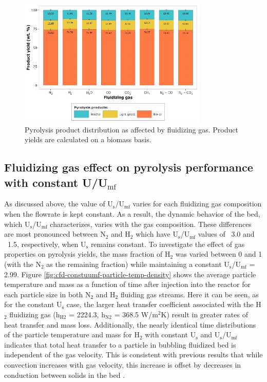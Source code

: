 \begin{figure}[H]
    \centering
    \includegraphics[width=0.8\textwidth]{figures/cfd-yields.pdf}
    \caption{Pyrolysis product distribution as affected by fluidizing gas. Product yields are calculated on a biomass basis.}
    \label{fig:cfd-yields}
\end{figure}


\subsection{Fluidizing gas effect on pyrolysis performance with constant \texorpdfstring{U/U$_\text{mf}$}{U/Umf}}

As discussed above, the value of U$_\text{s}$/U$_\text{mf}$ varies for each fluidizing gas composition when the flowrate is kept constant. As a result, the dynamic behavior of the bed, which U$_\text{s}$/U$_\text{mf}$ characterizes, varies with the gas composition. These differences are most pronounced between N$_2$ and H$_2$ which have U$_\text{s}$/U$_\text{mf}$ values of ~3.0 and ~1.5, respectively, when U$_\text{s}$ remains constant. To investigate the effect of gas properties on pyrolysis yields, the mass fraction of H$_2$ was varied between 0 and 1 (with the N$_2$ as the remaining fraction) while maintaining a constant U$_\text{s}$/U$_\text{mf}$ = 2.99. Figure \ref{fig:cfd-constuumf-particle-temp-density} shows the average particle temperature and mass as a function of time after injection into the reactor for each particle size in both N$_{2}$ and H$_{2}$ fluiding gas streams. Here it can be seen, as for the constant U$_\text{s}$ case, the larger heat transfer coefficient associated with the H$_2$ fluidizing gas (h$_\text{H2}$ = 2224.3, h$_\text{N2}$ = 368.5 W/m$^2$K) result in greater rates of heat transfer and mass loss. Additionally, the nearly identical time distributions of the particle temperature and mass for H$_2$ with constant U$_\text{s}$ and U$_\text{s}$/U$_\text{mf}$ indicates that total heat transfer to a particle in bubbling fluidized bed is independent of the gas velocity. This is consistent with previous results that while convection increases with gas velocity, this increase is offset by decreases in conduction between solids in the bed \cite{Collier-2004,zhou2009particle}.

